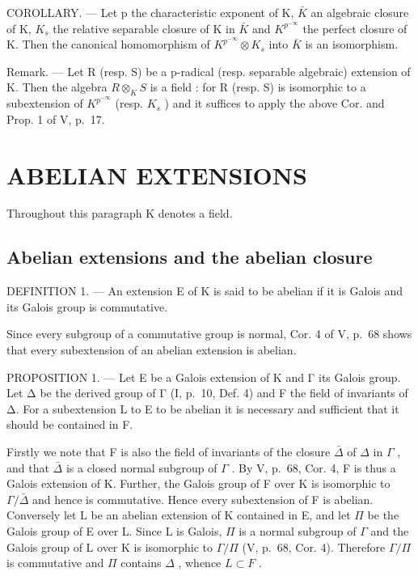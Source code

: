 COROLLARY. --- Let p the characteristic exponent of K, \(\bar{K}\) an algebraic closure of K, \(K_{s}\) the relative separable closure of K in \(\bar{K}\) and \(K^{p^{-\infty}}\) the perfect closure of K. Then the canonical homomorphism of \(K^{p^{-\infty}} \otimes K_{s}\) into \(\bar{K}\) is an isomorphism.

Remark. --- Let R (resp. S) be a p-radical (resp. separable algebraic) extension of K. Then the algebra \(R \otimes_{K} S\) is a field : for R (resp. S) is isomorphic to a subextension of \(K^{p^{-\infty}}\) (resp. \(K_{s}\) ) and it suffices to apply the above Cor. and Prop. 1 of V, p.~17.

\section{ABELIAN EXTENSIONS}

Throughout this paragraph K denotes a field.

\subsection{Abelian extensions and the abelian closure}

DEFINITION 1. --- An extension E of K is said to be abelian if it is Galois and its Galois group is commutative.

Since every subgroup of a commutative group is normal, Cor. 4 of V, p.~68 shows that every subextension of an abelian extension is abelian.

PROPOSITION 1. --- Let E be a Galois extension of K and Γ its Galois group. Let Δ be the derived group of Γ (I, p.~10, Def. 4) and F the field of invariants of Δ. For a subextension L to E to be abelian it is necessary and sufficient that it should be contained in F.

Firstly we note that F is also the field of invariants of the closure \(\bar{\Delta}\) of \(\Delta\) in \(\Gamma\) , and that \(\bar{\Delta}\) is a closed normal subgroup of \(\Gamma\) . By V, p.~68, Cor. 4, F is thus a Galois extension of K. Further, the Galois group of F over K is isomorphic to \(\Gamma/\bar{\Delta}\) and hence is commutative. Hence every subextension of F is abelian. Conversely let L be an abelian extension of K contained in E, and let \(\Pi\) be the Galois group of E over L. Since L is Galois, \(\Pi\) is a normal subgroup of \(\Gamma\) and the Galois group of L over K is isomorphic to \(\Gamma/\Pi\) (V, p.~68, Cor. 4). Therefore \(\Gamma/\Pi\) is commutative and \(\Pi\) contains \(\Delta\) , whence \(L \subset F\) .


